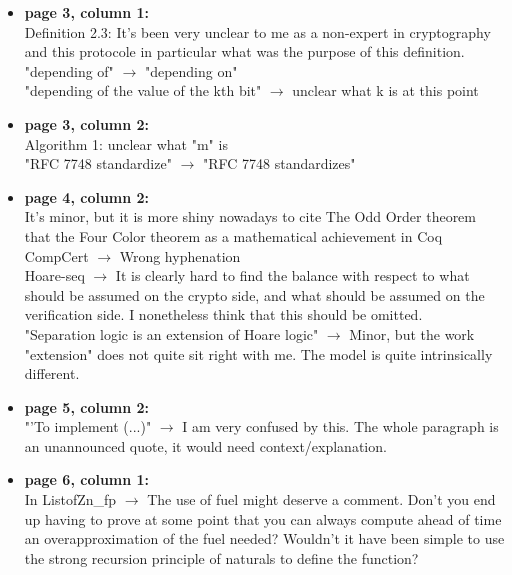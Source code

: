 \begin{itemize}

    \item \textbf{page 3, column 1:}\\
          Definition 2.3: It's been very unclear to me as a non-expert in cryptography and this protocole in particular what was the purpose of this definition.\\
          {\color{gray}"depending of" $\rightarrow$ "depending on"}\\
          "depending of the value of the kth bit" $\rightarrow$ unclear what k is at this point

    \item \textbf{page 3, column 2:}\\
          Algorithm 1: unclear what "m" is\\
          {\color{gray}"RFC 7748 standardize" $\rightarrow$   "RFC 7748 standardizes"}

    \item \textbf{page 4, column 2:}\\
          It's minor, but it is more shiny nowadays to cite The Odd Order theorem that the Four Color theorem as a mathematical achievement in Coq\\
          CompCert $\rightarrow$ Wrong hyphenation\\
          Hoare-seq $\rightarrow$ It is clearly hard to find the balance with respect to what should be assumed on the crypto side, and what should be assumed on the verification side. I nonetheless think that this should be omitted.\\
          "Separation logic is an extension of Hoare logic" $\rightarrow$ Minor, but the work "extension" does not quite sit right with me. The model is quite intrinsically different.

    \item \textbf{page 5, column 2:}\\
          "'To implement (...)" $\rightarrow$ I am very confused by this. The whole paragraph is an unannounced quote, it would need context/explanation.

    \item \textbf{page 6, column 1:}\\
          In ListofZn\_fp $\rightarrow$ The use of fuel might deserve a comment. Don't you end up having to prove at some point that you can always compute ahead of time an overapproximation of the fuel needed? Wouldn't it have been simple to use the strong recursion principle of naturals to define the function?
\end{itemize}

